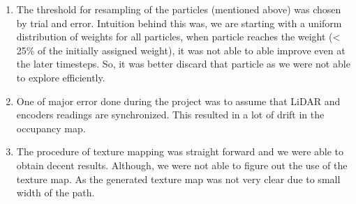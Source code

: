 \documentclass[a4paper]{article}
\begin{document}
\begin{enumerate}
    \item The threshold for resampling of the particles (mentioned above) was chosen by trial and error. Intuition behind this was, we are starting with a uniform distribution of weights for all particles, when particle reaches the weight (< 25\% of the initially assigned weight), it was not able to able improve even at the later timesteps. So, it was better discard that particle as we were not able to explore efficiently.
    \item One of major error done during the project was to assume that LiDAR and encoders readings are synchronized. This resulted in a lot of drift in the occupancy map.
    \item The procedure of texture mapping was straight forward and we were able to obtain decent results. Although, we were not able to figure out the use of the texture map. As the generated texture map was not very clear due to small width of the path.
\end{enumerate}
\end{document}
